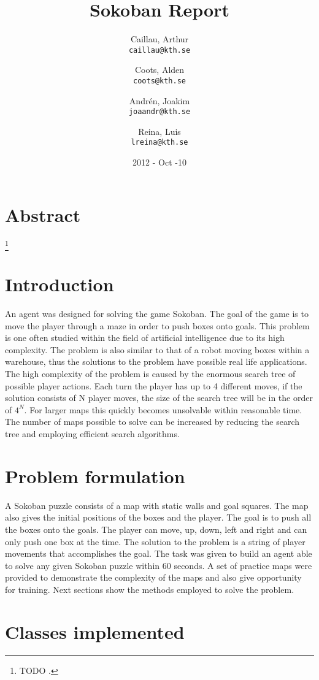 \documentclass{article}
\title { Sokoban Report}
\author{
  Caillau, Arthur\\
  \texttt{caillau@kth.se}
  \and
  Coots, Alden\\
  \texttt{coots@kth.se}
 \and
  Andrén, Joakim\\
  \texttt{joaandr@kth.se}
  \and
  Reina, Luis\\
  \texttt{lreina@kth.se}
}
\date {2012 - Oct -10}
\begin{document}
\maketitle
\section { Abstract }
\lipsum[1]\footnote { TODO .}

\section { Introduction }
An agent was designed for solving the game Sokoban. The goal of the game is to move the player through a maze in order to push boxes onto goals. This problem is one often studied within the field of artificial intelligence due to its high complexity. The problem is also similar to that of a robot moving boxes within a warehouse, thus the solutions to the problem have possible real life applications. The high complexity of the problem is caused by the enormous search tree of possible player actions. Each turn the player has up to 4 different moves, if the solution consists of N player moves, the size of the search tree will be in the order of \begin{math} 4^{N} \end{math}. For larger maps this quickly becomes unsolvable within reasonable time. The number of maps possible to solve can be increased by reducing the search tree and employing efficient search algorithms. 

\section { Problem formulation }
A Sokoban puzzle consists of a map with static walls and goal squares. The map also gives the initial positions of the boxes and the player. The goal is to push all the boxes onto the goals. The player can move, up, down, left and right and can only push one box at the time. The solution to the problem is a string of player movements that accomplishes the goal. The task was given to build an agent able to solve any given Sokoban puzzle within 60 seconds. A set of practice maps were provided to demonstrate the complexity of the maps and also give opportunity for training. Next sections show the methods employed to solve the problem. 
\section{Classes implemented}
\end{document}

